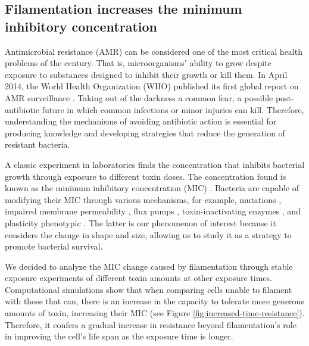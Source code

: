 \documentclass[a4paper, nobind]{templates/ociamthesis}
\begin{document}
\hypertarget{filamentation-increases-the-minimum-inhibitory-concentration}{%
\subsection{Filamentation increases the minimum inhibitory concentration}\label{filamentation-increases-the-minimum-inhibitory-concentration}}

Antimicrobial resistance (AMR) can be considered one of the most critical health problems of the century. That is, microorganisms' ability to grow despite exposure to substances designed to inhibit their growth or kill them. In April 2014, the World Health Organization (WHO) published its first global report on AMR surveillance \autocite{EditorialBoard2014}. Taking out of the darkness a common fear, a possible post-antibiotic future in which common infections or minor injuries can kill. Therefore, understanding the mechanisms of avoiding antibiotic action is essential for producing knowledge and developing strategies that reduce the generation of resistant bacteria.

A classic experiment in laboratories finds the concentration that inhibits bacterial growth through exposure to different toxin doses. The concentration found is known as the minimum inhibitory concentration (MIC) \autocite{andrewsDeterminationMinimumInhibitory2002}. Bacteria are capable of modifying their MIC through various mechanisms, for example, mutations \autocite{lambertBacterialResistanceAntibiotics2005}, impaired membrane permeability \autocite{satoOuterMembranePermeability1991}, flux pumps \autocite{webberImportanceEffluxPumps2003}, toxin-inactivating enzymes \autocite{wrightBacterialResistanceAntibiotics2005}, and plasticity phenotypic \autocite{justiceMorphologicalPlasticityBacterial2008}. The latter is our phenomenon of interest because it considers the change in shape and size, allowing us to study it as a strategy to promote bacterial survival.

We decided to analyze the MIC change caused by filamentation through stable exposure experiments of different toxin amounts at other exposure times. Computational simulations show that when comparing cells unable to filament with those that can, there is an increase in the capacity to tolerate more generous amounts of toxin, increasing their MIC (see Figure \ref{fig:increased-time-resistance}). Therefore, it confers a gradual increase in resistance beyond filamentation's role in improving the cell's life span as the exposure time is longer.
\end{document}
